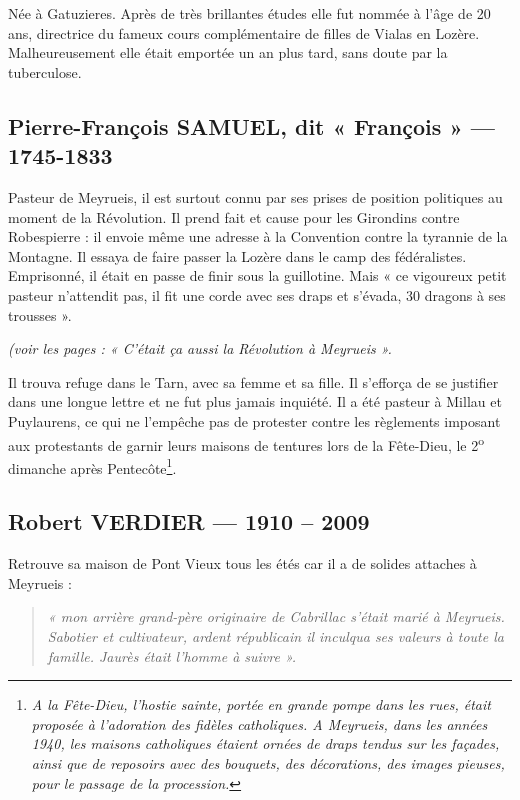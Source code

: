 Née à Gatuzieres. Après de très brillantes études elle fut nommée à l’âge de 20
ans, directrice du fameux cours complémentaire de filles de Vialas en Lozère.
Malheureusement elle était emportée un an plus tard, sans doute par la tuberculose.

\subsection{Pierre-François SAMUEL, dit « François » --- 1745-1833}

Pasteur de Meyrueis, il est surtout connu par ses prises de position politiques au
moment de la Révolution. Il prend fait et cause pour les Girondins contre
Robespierre : il envoie même une adresse à la Convention contre la tyrannie de la
Montagne. Il essaya de faire passer la Lozère dans le camp des fédéralistes.
Emprisonné, il était en passe de finir sous la guillotine. Mais « ce vigoureux petit
pasteur n’attendit pas, il fit une corde avec ses draps et s’évada, 30 dragons à ses
trousses ».

\emph{(voir les pages : « C’était ça aussi la Révolution à Meyrueis ».}

Il trouva refuge dans le Tarn, avec sa femme et sa fille. Il s’efforça de se justifier
dans une longue lettre et ne fut plus jamais inquiété. Il a été pasteur à Millau et
Puylaurens, ce qui ne l’empêche pas de protester contre les règlements imposant
aux protestants de garnir leurs maisons de tentures lors de la Fête-Dieu, le 2\textsuperscript{o}
dimanche après Pentecôte\footnote{\emph{A la Fête-Dieu, l’hostie sainte, portée en grande pompe dans les rues, était proposée à l’adoration des fidèles catholiques. A Meyrueis, dans les années 1940, les maisons catholiques étaient ornées de draps tendus sur les façades, ainsi que de reposoirs avec des bouquets, des décorations, des images pieuses, pour le passage de la procession.}}.

\subsection{Robert VERDIER --- 1910 -- 2009}

Retrouve sa maison de Pont Vieux tous les étés car il a de solides attaches à
Meyrueis :

\begin{quote}
\emph{« mon arrière grand-père originaire de Cabrillac s’était marié à Meyrueis. Sabotier
et cultivateur, ardent républicain il inculqua ses valeurs à toute la famille. Jaurès
était l’homme à suivre ».}
\end{quote}

